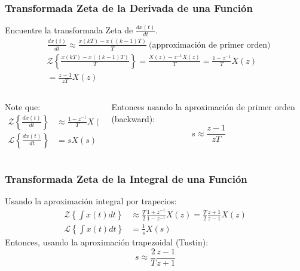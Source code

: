 \documentclass[aspectratio=169,handout]{beamer}
\theoremstyle{definition}
\theoremstyle{plain}
\theoremstyle{remark}
\begin{document}
\begin{frame}[c]\frametitle{Transformada Zeta de la Derivada de una Función}
	Encuentre la transformada Zeta de $\frac{dx(t)}{dt}$.
	\pause
	\begin{align*}
		&\frac{dx(t)}{dt} \approx \frac{x(kT) - x((k-1)T)}{T}\ \text{(approximación de primer orden)}\\
		&\mathcal{Z}\left\{\frac{x(kT) - x((k-1)T)}{T}\right\} = \frac{X(z)-z^{-1}X(z)}{T} = \frac{1-z^{-1}}{T} X(z)\\
		&= \frac{z-1}{zT} X(z)
	\end{align*}
	\vspace*{-3mm}
	\begin{columns}
		\pause
		\begin{column}{0.5\textwidth}
			Note que:
			\begin{align*}
				\mathcal{Z}\left\{\frac{dx(t)}{dt}\right\} &\approx \frac{1-z^{-1}}{T} X(z) \\
				\mathcal{L}\left\{\frac{dx(t)}{dt}\right\} &= s X(s)
			\end{align*}
		\end{column}
		\pause
		\begin{column}{0.5\textwidth}
		Entonces usando la aproximación de primer orden (backward):
		\begin{equation*}
			s \approx \frac{z-1}{zT}
		\end{equation*}
		\end{column}
	\end{columns}
\end{frame}

\begin{frame}[c]\frametitle{Transformada Zeta de la Integral de una Función}
	Usando la aproximación integral por trapecios:
	\begin{align*}
				\mathcal{Z}\left\{\int x(t) dt\right\} &\approx \frac{T}{2} \frac{1+z^{-1}}{1-z^{-1}} X(z) = \frac{T}{2} \frac{z+1}{z-1} X(z) \\
				\mathcal{L}\left\{\int x(t) dt\right\} &= \frac{1}{s} X(s)
	\end{align*}
	\pause
	Entonces, usando la aproximación trapezoidal (Tustin):
	\begin{equation*}
		s \approx \frac{2}{T}\frac{z-1}{z+1}
	\end{equation*}
\end{frame}
\end{document}
